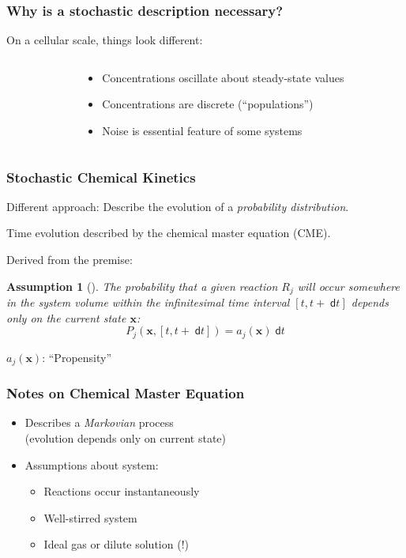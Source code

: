 \documentclass[xcolor={usenames,dvipsnames,svgnames}]{beamer}
\newcommand{\dee}{\;\mathsf{d}}
\renewcommand{\vec}[1]{\ensuremath{\mathbf{#1}}}
\newtheorem{assumption}{Assumption}
\begin{document}
\begin{frame}
    \frametitle{Why is a stochastic description necessary?}
    On a cellular scale, things look different:
    \hfill
    \begin{columns}[c]
        \begin{column}{0.5\textwidth}
            \begin{center}
                \resizebox{\textwidth}{!}{
                    
                }
            \end{center}
        \end{column}
        \begin{column}{0.5\textwidth}
            \begin{itemize}
                \item Concentrations oscillate about steady-state values
                \item Concentrations are discrete (``populations'')
                \item Noise is essential feature of some systems
            \end{itemize}
        \end{column}
    \end{columns}
\end{frame}

\begin{frame}
    \frametitle{Stochastic Chemical Kinetics}
    Different approach: Describe the evolution of a \emph{probability distribution}.
    
    Time evolution described by the chemical master equation (CME).
    \pause

    Derived from the premise:
    \begin{assumption}[\cite{gillespie-07}]
        The probability that a given reaction $R_j$ will occur somewhere in the system volume within the infinitesimal time interval $[t, t+\dee t]$ depends only on the current state $\vec{x}$:
        \[
            P_j(\vec{x}, [t, t+\dee t]) = a_j(\vec{x})\dee t
        \]
    \end{assumption}

    $a_j(\vec{x})$: ``Propensity''
\end{frame}

\begin{frame}
    \frametitle{Notes on Chemical Master Equation}
    \begin{itemize}
        \item Describes a \emph{Markovian} process\\
            (evolution depends only on current state)

        \item Assumptions about system:
        \begin{itemize}
            \item Reactions occur instantaneously
            \item Well-stirred system
            \item Ideal gas or dilute solution (!)
        \end{itemize}
    \end{itemize}
\end{frame}
\end{document}
